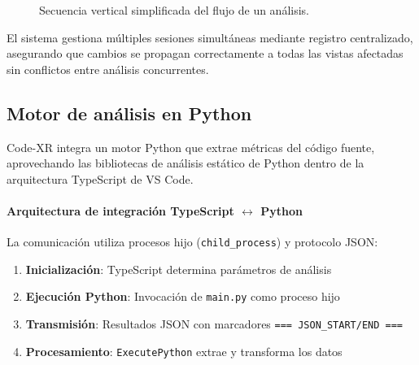 \documentclass[a4paper, 12pt]{book}
\begin{document}
\begin{figure}[H]
\centering
{}
\caption{Secuencia vertical simplificada del flujo de un análisis.}
\label{fig:flujo-vertical}
\end{figure}

\noindent El sistema gestiona múltiples sesiones simultáneas mediante registro centralizado, asegurando que cambios se propagan correctamente a todas las vistas afectadas sin conflictos entre análisis concurrentes.

\subsection{Motor de análisis en Python}
\label{sec:motor-python}

Code-XR integra un motor Python que extrae métricas del código fuente, aprovechando las bibliotecas de análisis estático de Python dentro de la arquitectura TypeScript de VS Code.

\paragraph{Arquitectura de integración TypeScript $\leftrightarrow$ Python}
La comunicación utiliza procesos hijo (\texttt{child\_process}) y protocolo JSON:
%
\begin{enumerate}
  \item \textbf{Inicialización}: TypeScript determina parámetros de análisis
  \item \textbf{Ejecución Python}: Invocación de \texttt{main.py} como proceso hijo
  \item \textbf{Transmisión}: Resultados JSON con marcadores \texttt{=== JSON\_START/END ===}
  \item \textbf{Procesamiento}: \texttt{ExecutePython} extrae y transforma los datos
\end{enumerate}
\end{document}
